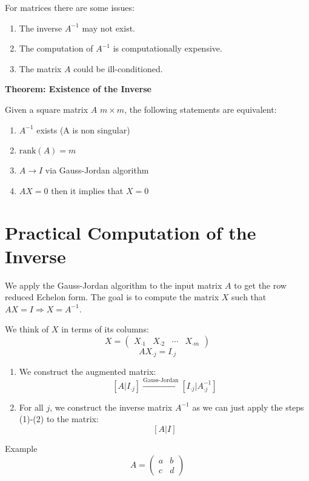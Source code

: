 For matrices there are some issues:
\begin{enumerate}
    \item The inverse $A^{-1}$ may not exist.
    \item The computation of $A^{-1}$ is computationally expensive.
    \item The matrix $A$ could be ill-conditioned.
\end{enumerate}

\textbf{Theorem: Existence of the Inverse}

Given a square matrix $A$ $m \times m$, the following statements are equivalent:
\begin{enumerate}
    \item $A^{-1}$ exists (A is non singular)
    \item $\text{rank}(A) = m$
    \item $A \rightarrow I$ via Gauss-Jordan algorithm
    \item $AX = 0$ then it implies that $X = 0$
\end{enumerate}

\section{Practical Computation of the Inverse}





We apply the Gauss-Jordan algorithm to the input matrix $A$ to get the row reduced Echelon form. The goal is to compute the matrix $X$ such that $AX = I \Rightarrow X = A^{-1}$.

We think of $X$ in terms of its columns:
\[
X = \begin{pmatrix}
    X_{\cdot 1} & X_{\cdot 2} & \cdots & X_{\cdot m}
\end{pmatrix}
\]
\[
A X_{\cdot j} = I_{\cdot j}
\]

\begin{enumerate}
    \item We construct the augmented matrix:
    \[
    \left[ A | I_{\cdot j} \right] \xrightarrow{\text{Gauss-Jordan}}
    \left[ I_{\cdot j} | A^{-1}_{\cdot j} \right]
    \]
    
    \item For all $j$, we construct the inverse matrix $A^{-1}$ as we can just apply the steps (1)-(2) to the matrix:
    \[
    \left[ A | I \right]
    \]
\end{enumerate}

Example
\[
A = \begin{pmatrix}
    a & b \\
    c & d
\end{pmatrix}
\]



